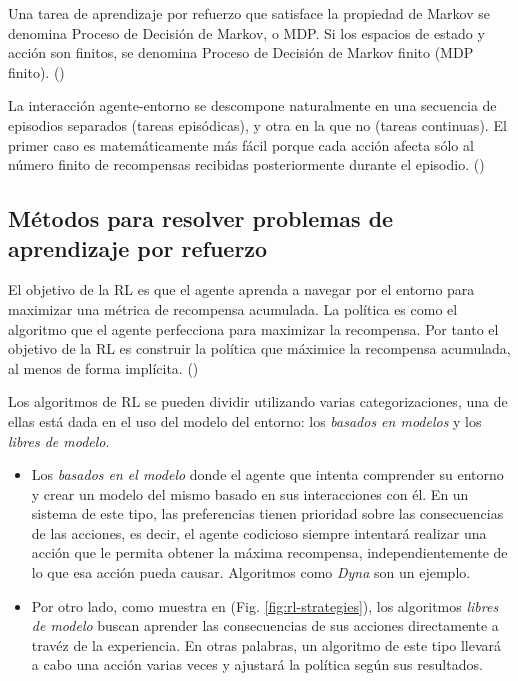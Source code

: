 Una tarea de aprendizaje por refuerzo que satisface la propiedad de Markov se denomina Proceso de Decisión de Markov, o MDP. Si los espacios de estado y acción son finitos, se denomina Proceso de Decisión de Markov finito (MDP finito). (\cite{wiering2012reinforcement})

La interacción agente-entorno se descompone naturalmente en una secuencia de episodios separados (tareas episódicas), y otra en la que no (tareas continuas). El primer caso es matemáticamente más fácil porque cada acción afecta sólo al número finito de recompensas recibidas posteriormente durante el episodio. (\cite{wiering2012reinforcement})

\subsection{Métodos para resolver problemas de aprendizaje por refuerzo}

El objetivo de la RL es que el agente aprenda a navegar por el entorno para maximizar una métrica de recompensa acumulada. La política es como el algoritmo que el agente perfecciona para maximizar la recompensa. Por tanto el objetivo de la RL es construir la política que máximice la recompensa acumulada, al menos de forma implícita. (\cite{sutton1998introduction})

Los algoritmos de RL se pueden dividir utilizando varias categorizaciones, una de ellas está dada en el uso del modelo del entorno: los \textit{basados en modelos} y los \textit{libres de modelo}.

\begin{itemize}
\item Los \textit{basados en el modelo} donde el agente que intenta comprender su entorno y crear un modelo del mismo basado en sus interacciones con él. En un sistema de este tipo, las preferencias tienen prioridad sobre las consecuencias de las acciones, es decir, el agente codicioso siempre intentará realizar una acción que le permita obtener la máxima recompensa, independientemente de lo que esa acción pueda causar. Algoritmos como \textit{Dyna} son un ejemplo.

\item Por otro lado, como muestra en (Fig. \ref{fig:rl-strategies}), los algoritmos \textit{libres de modelo} buscan aprender las consecuencias de sus acciones directamente a travéz de la experiencia. En otras palabras, un algoritmo de este tipo llevará a cabo una acción varias veces y ajustará la política según sus resultados.
\end{itemize}

